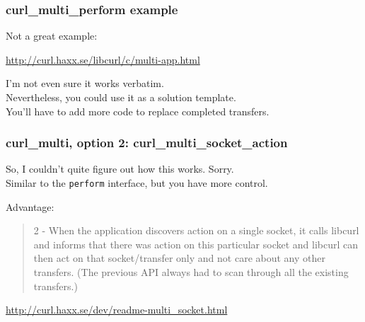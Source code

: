 \documentclass[aspectratio=43]{beamer}
\newenvironment{changemargin}[1]{%
  \begin{list}{}{%
    \setlength{\topsep}{0pt}%
    \setlength{\leftmargin}{#1}%
    \setlength{\rightmargin}{1em}
    \setlength{\listparindent}{\parindent}%
    \setlength{\itemindent}{\parindent}%
    \setlength{\parsep}{\parskip}%
  }%
  \item[]}{\end{list}}
\begin{document}
\begin{frame}
  \frametitle{curl\_multi\_perform example}

  \begin{changemargin}{1.5cm}
    Not a great example:

\begin{center}
\url{http://curl.haxx.se/libcurl/c/multi-app.html}
\end{center}

    I'm not even sure it works verbatim.\\[1em]

    Nevertheless, you could use it as a solution template.\\
    You'll have to add more code to replace completed transfers.
  \end{changemargin}

\end{frame}

\begin{frame}
  \frametitle{curl\_multi, option 2: curl\_multi\_socket\_action}

  \begin{changemargin}{1.5cm}
    So, I couldn't quite figure out how this works. Sorry.\\[1em]

    Similar to the {\tt perform} interface, but you have more control.

    Advantage:

\begin{quote}
   2 - When the application discovers action on a single socket, it calls
       libcurl and informs that there was action on this particular socket and
       libcurl can then act on that socket/transfer only and not care about
       any other transfers. (The previous API always had to scan through all
       the existing transfers.)
\end{quote}

\url{http://curl.haxx.se/dev/readme-multi_socket.html}

  \end{changemargin}
\end{frame}
\end{document}
